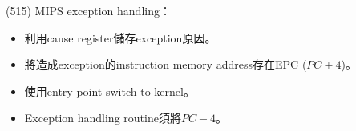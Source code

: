 \item \begin{theorem}{(515)} MIPS exception handling： \begin{itemize}
        \item 利用cause register儲存exception原因。
        \item 將造成exception的instruction memory address存在EPC ($PC + 4$)。
        \item 使用entry point switch to kernel。
        \item Exception handling routine須將$PC - 4$。
    \end{itemize}
\end{theorem}
